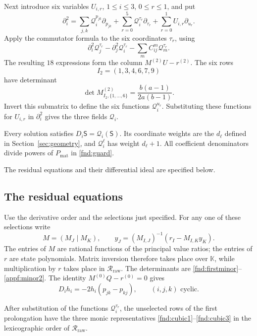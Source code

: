 \documentclass[11pt,a4paper]{article}
\numberwithin{equation}{section}
\theoremstyle{plain}
\theoremstyle{definition}
\theoremstyle{remark}
\begin{document}
Next introduce six variables $U_{i,r}$, $1\le i\le3$, $0\le r\le1$, and put
\[
\partial_i^2=\sum_{j,k}\mathcal Q_i^{p_{jk}}\partial_{p_{jk}}
+\sum_{r=0}^5\mathcal Q_i^{\tau_r}\partial_{\tau_r}
+\sum_{r=0}^1U_{i,r}\partial_{u_r}.
\]
Apply the commutator formula to the six coordinates $\tau_r$, using
\[
 \partial_i^2\mathcal Q_j^{\tau_r}-\partial_j^2\mathcal Q_i^{\tau_r}
 -\sum_m C^m_{ij}\mathcal Q_m^{\tau_r}.
\]
The resulting $18$ expressions form the column $M^{(2)}U-r^{(2)}$. The six rows
\[
I_2=(1,3,4,6,7,9)
\]
have determinant
\begin{equation}\label{appf:minor2}
\det M^{(2)}_{I_2,\{1,\ldots,6\}}=\frac{b(a-1)}{2a(b-1)}.
\end{equation}
Invert this submatrix to define the six functions $\mathcal Q_i^{u_r}$.
Substituting these functions for $U_{i,r}$ in $\partial_i^2$ gives
the three fields $\mathcal Q_i$.

Every solution satisfies $D_i\mathsf S=\mathcal Q_i(\mathsf S)$. Its coordinate weights are the $d_\ell$ defined in Section~\ref{sec:geometry}, and $\mathcal Q_i^\ell$ has weight $d_\ell+1$. All coefficient denominators divide powers of $P_{\mathrm{mat}}$ in \eqref{fnd:guard}.

The residual equations and their differential ideal are specified below.

\subsection{The residual equations}

Use the derivative order and the selections just specified. For any one of these selections write
\[
 M=(M_J\mid M_K),\qquad
 y_J=(M_{I,J})^{-1}(r_I-M_{I,K}y_K).
\]
The entries of $M$ are rational functions of the principal value ratios; the entries of $r$
are state polynomials. Matrix inversion therefore takes place over
$\mathbb K$, while multiplication by $r$ takes place in $\mathscr R_{\mathrm{raw}}$.
The determinants are \eqref{fnd:firstminor}--\eqref{appf:minor2}.
The identity $M^{(0)}Q-r^{(0)}=0$ gives
\begin{equation}\label{appf:contactderivatives}
 D_i h_i=-2h_i(p_{jk}-p_{kj}),\qquad (i,j,k)\text{ cyclic}.
\end{equation}

After substitution of the functions $\mathcal Q_i^{\tau_r}$, the unselected rows of the first prolongation have the three monic representatives
\eqref{fnd:cubic1}--\eqref{fnd:cubic3} in the lexicographic order of
$\mathscr R_{\mathrm{raw}}$.
\end{document}
